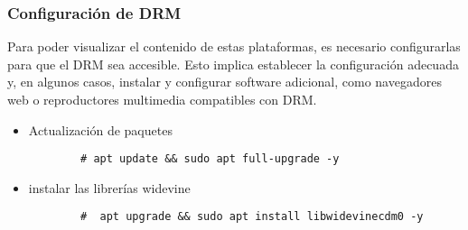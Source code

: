 \documentclass[report,12pt]{article}
\begin{document}
	\subsubsection{Configuración de DRM}
	Para poder visualizar el contenido de estas plataformas, es necesario configurarlas para que el DRM sea accesible. Esto implica establecer la configuración adecuada y, en algunos casos, instalar y configurar software adicional, como navegadores web o reproductores multimedia compatibles con DRM. \cite{raspberryparanovatos}
	
	\begin{itemize}
		\item Actualización de paquetes\par  
		\vspace{-0.5cm}
		\begingroup
		\color{gray}
		\begin{verbatim}
		# apt update && sudo apt full-upgrade -y
		\end{verbatim}
		\endgroup			
		\vspace{-1cm}
		\item instalar las librerías widevine \par 
		\vspace{-0.5cm}
		\begingroup
		\color{gray}
		\begin{verbatim}
		#  apt upgrade && sudo apt install libwidevinecdm0 -y
		\end{verbatim}
		\endgroup
	\end{itemize}
	 \vspace{-2cm}
	 
	 
\end{document}
